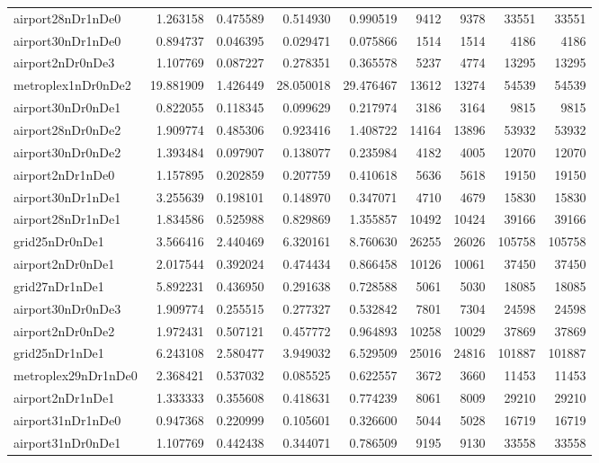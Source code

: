 \begin{longtable}{|l|r|r|r|r|r|r|r|r|}
airport28nDr1nDe0 & 1.263158 & 0.475589 & 0.514930 & 0.990519 & 9412 & 9378 & 33551 & 33551 \\
airport30nDr1nDe0 & 0.894737 & 0.046395 & 0.029471 & 0.075866 & 1514 & 1514 & 4186 & 4186 \\
airport2nDr0nDe3 & 1.107769 & 0.087227 & 0.278351 & 0.365578 & 5237 & 4774 & 13295 & 13295 \\
metroplex1nDr0nDe2 & 19.881909 & 1.426449 & 28.050018 & 29.476467 & 13612 & 13274 & 54539 & 54539 \\
airport30nDr0nDe1 & 0.822055 & 0.118345 & 0.099629 & 0.217974 & 3186 & 3164 & 9815 & 9815 \\
airport28nDr0nDe2 & 1.909774 & 0.485306 & 0.923416 & 1.408722 & 14164 & 13896 & 53932 & 53932 \\
airport30nDr0nDe2 & 1.393484 & 0.097907 & 0.138077 & 0.235984 & 4182 & 4005 & 12070 & 12070 \\
airport2nDr1nDe0 & 1.157895 & 0.202859 & 0.207759 & 0.410618 & 5636 & 5618 & 19150 & 19150 \\
airport30nDr1nDe1 & 3.255639 & 0.198101 & 0.148970 & 0.347071 & 4710 & 4679 & 15830 & 15830 \\
airport28nDr1nDe1 & 1.834586 & 0.525988 & 0.829869 & 1.355857 & 10492 & 10424 & 39166 & 39166 \\
grid25nDr0nDe1 & 3.566416 & 2.440469 & 6.320161 & 8.760630 & 26255 & 26026 & 105758 & 105758 \\
airport2nDr0nDe1 & 2.017544 & 0.392024 & 0.474434 & 0.866458 & 10126 & 10061 & 37450 & 37450 \\
grid27nDr1nDe1 & 5.892231 & 0.436950 & 0.291638 & 0.728588 & 5061 & 5030 & 18085 & 18085 \\
airport30nDr0nDe3 & 1.909774 & 0.255515 & 0.277327 & 0.532842 & 7801 & 7304 & 24598 & 24598 \\
airport2nDr0nDe2 & 1.972431 & 0.507121 & 0.457772 & 0.964893 & 10258 & 10029 & 37869 & 37869 \\
grid25nDr1nDe1 & 6.243108 & 2.580477 & 3.949032 & 6.529509 & 25016 & 24816 & 101887 & 101887 \\
metroplex29nDr1nDe0 & 2.368421 & 0.537032 & 0.085525 & 0.622557 & 3672 & 3660 & 11453 & 11453 \\
airport2nDr1nDe1 & 1.333333 & 0.355608 & 0.418631 & 0.774239 & 8061 & 8009 & 29210 & 29210 \\
airport31nDr1nDe0 & 0.947368 & 0.220999 & 0.105601 & 0.326600 & 5044 & 5028 & 16719 & 16719 \\
airport31nDr0nDe1 & 1.107769 & 0.442438 & 0.344071 & 0.786509 & 9195 & 9130 & 33558 & 33558 \\

\end{longtable}
